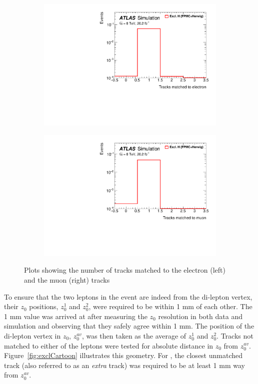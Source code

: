 \begin{figure}[!h]
\begin{subfigure}{0.5\textwidth}
   \includegraphics[width=\textwidth]{figures/em-CutChannels-nTrkMatch0-log.pdf}
\end{subfigure}%
\begin{subfigure}{0.5\textwidth}
   \includegraphics[width=\textwidth]{figures/me-CutChannels-nTrkMatch0-log.pdf}
\end{subfigure} 
\caption{Plots showing the number of tracks matched to the electron (left) and the muon (right) tracks}
\label{fig:trkMatch}
\end{figure}

\par To ensure that the two leptons in the event are indeed from the di-lepton 
vertex, their $z_0$ positions, $z_0^1$ and $z_0^2$, were required to be within 1 mm of each other. 
The 1 mm value was arrived at after measuring the $z_0$ resolution in both data and simulation and 
observing that they safely agree within 1 mm. The position of the di-lepton vertex in $z_0$, $z^{av}_0$, was then 
taken as the average of $z_0^1$ and $z_0^2$. Tracks not matched to either of the leptons 
were tested for absolute distance in $z_0$ from $z_0^{av}$. Figure~\ref{fig:exclCartoon} 
illustrates this geometry. For \DZ, the closest unmatched track (also referred to as an {\it extra} track) 
was required to be at least 1 mm way from $z_0^{av}$. 

